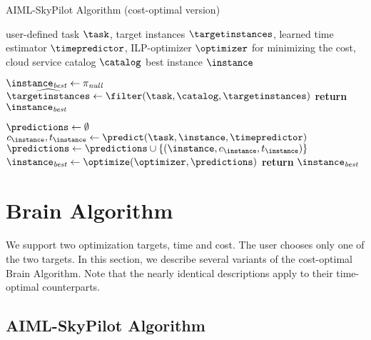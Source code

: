 \documentclass[runningheads]{llncs}
\begin{document}
\begin{algorithm}[h]
	\caption{AIML-SkyPilot Algorithm (cost-optimal version)}
	\label{alg:aiml-skypilot}
	\begin{algorithmic}[1]
		\Require user-defined task $\task$, target instances $\targetinstances$, learned time estimator $\timepredictor$, ILP-optimizer $\optimizer$ for minimizing the cost, cloud service catalog $\catalog$
		\Ensure best instance $\instance$%
		
		\State $\instance_{\it best} \gets \pi_{\it null}$
		\State $\widehat{\targetinstances} \gets \filter(\task, \catalog, \targetinstances)$
		\If{$\widehat{\targetinstances}$ = $\emptyset$}
		\State \textbf{return} $\instance_{\it best}$
		\EndIf

		\State $\predictions \gets \emptyset$
		\ForAll{$\instance \in \widehat{\targetinstances}$}
		\State $c_\instance, t_\instance \gets \predict(\task, \instance, \timepredictor)$
		\State $\predictions \gets \predictions \cup \{(\instance, c_\instance, t_\instance)\}$
		\EndFor
		\State $\instance_{\it best}  \gets \optimize(\optimizer, \predictions)$
		\State \textbf{return} $\instance_{\it best}$%
	\end{algorithmic}
\end{algorithm}

\section{Brain Algorithm}
We support two optimization targets, time and cost. The user chooses only one of the two targets. In this section, we describe several variants of the cost-optimal Brain Algorithm. Note that the nearly identical descriptions apply to their time-optimal counterparts.

\subsection{AIML-SkyPilot Algorithm}
\end{document}
